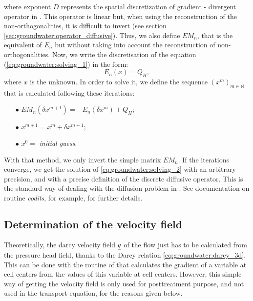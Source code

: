 where exponent $D$ represents the spatial discretization of gradient - divergent operator in \CS. This operator is linear but, when using
the reconstruction of the non-orthogonalities, it is difficult to invert (see section \ref{sec:groundwater:operator_diffusive}).
Thus, we also define $EM_n$, that is the equivalent of $E_n$ but without taking into account the reconstruction of non-orthogonalities.
Now, we write the discretisation of the equation (\ref{eq:groundwater:solving_1}) in the form:
\begin{equation}
\label{eq:groundwater:solving_2}
E_n(x) = Q_H,
\end{equation}
where $x$ is the unknown. In order to solve it, we define the sequence $(x^m)_{m \in \mathbb{N}}$
that is calculated following these iterations:
\begin{itemize}
 \item[$\bullet$] $EM_n(\delta x^{m+1}) = - E_n(\delta x^{m}) + Q_H$;
 \item[$\bullet$] $x^{m+1} = x^m + \delta x^{m+1}$;
 \item[$\bullet$] $x^0 =$ \textit{initial guess}.
\end{itemize}
With that method, we only invert the simple matrix $EM_n$. If the iterations converge, we get the solution of \eqref{eq:groundwater:solving_2}
with an arbitrary precision, and with a precise definition of the discrete diffusive operator. This is the standard way
of dealing with the diffusion problem in \CS.
See documentation on routine \textit{codits}, for example, for further details.

\subsection{Determination of the velocity field}
\label{sec:groundwater:velocity_field}
Theoretically, the darcy velocity field $\underline{q}$ of the flow just has to be calculated from the pressure head field, thanks to the Darcy relation
\eqref{eq:groundwater:darcy_3d}. This can be done with the routine of \CS that calculates the gradient of a variable at cell centers from the values of this
variable at cell centers.
However, this simple way of getting the velocity field is only used for posttreatment purpose,
and not used in the transport equation, for the reasons given below.

